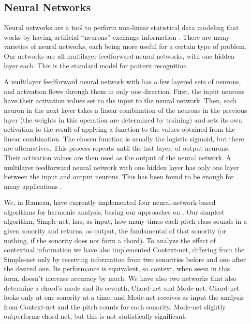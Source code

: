 \documentclass{article}
\begin{document}
\subsection{Neural Networks}
\label{sec:neural-nets}

Neural networks are a tool to perform non-linear statistical data
modeling that works by having artificial ``neurons'' exchange
information \cite{tsui02:_harmon_analy_using_neural_networ}. There are
many varieties of neural networks, each being more useful for a
certain type of problem. Our networks are all multilayer feedforward
neural networks, with one hidden layer each. This is the standard
model for pattern recognition.

A multilayer feedforward neural network with has a few layered sets of
neurons, and activation flows through them in only one
direction. First, the input neurons have their activation values set
to the input to the neural network. Then, each neuron in the next
layer takes a linear combination of the neurons in the previous layer
(the weights in this operation are determined by training) and sets
its own activation to the result of applying a function to the values
obtained from the linear combination. The chosen function is usually
the logistic sigmoid, but there are alternatives. This process repeats
until the last layer, of output neurons. Their activation values are
then used as the output of the neural network. A multilayer
feedforward neural network with one hidden layer has only one layer
between the input and output neurons. This has been found to be enough
for many applications \cite{tsui02:_harmon_analy_using_neural_networ}.

We, in Rameau, have currently implemented four neural-network-based
algorithms for harmonic analysis, basing our approaches on
\cite{tsui02:_harmon_analy_using_neural_networ}. Our simplest
algorithm, Simple-net, has, as input, how many times each pitch class
sounds in a given sonority and returns, as output, the fundamental of
that sonority (or nothing, if the sonority does not form a chord). To
analyze the effect of contextual information we have also implemented
Context-net, differing from the Simple-net only by receiving
information from two sonorities before and one after the desired
one. Its performance is equivalent, so context, when seem in this
form, doesn't increase accuracy by much. We have also two networks
that also determine a chord's mode and its seventh, Chord-net and
Mode-net. Chord-net looks only at one sonority at a time, and Mode-net
receives as input the analysis from Context-net and the pitch counts
for each sonority. Mode-net slightly outperforms chord-net, but this
is not statistically significant.
\end{document}
